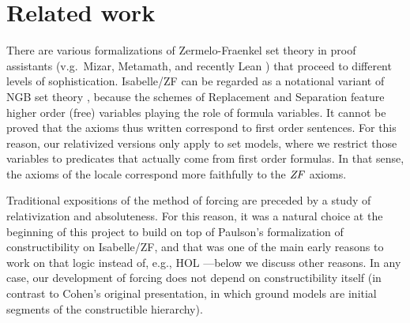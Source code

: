 \section{Related work}
\label{sec:related-work}


There are various formalizations of Zermelo-Fraenkel set theory in
proof assistants (v.g.\ Mizar, Metamath, and recently Lean
\cite{DBLP:conf/cade/MouraKADR15}) that proceed to different levels of
sophistication. Isabelle/ZF can be regarded as a notational variant of
NGB set theory \cite[Sect.~II.10]{kunen2011set}, because the schemes
of Replacement and Separation feature higher order (free) variables
playing the role of formula variables. It cannot be proved that the
axioms thus written correspond to first order sentences. For this
reason, our relativized versions only apply to set models, where
we restrict those variables to predicates that actually come
from first order formulas. In that sense, the axioms of the locale
 correspond more faithfully to the
$\mathit{ZF}$ axioms.

Traditional expositions of the method of forcing
\cite{kunen2011set,Jech_Millennium} are preceded by a study of
relativization and absoluteness. For this reason, it was a natural
choice at the beginning of this project to build on top of Paulson's
formalization of constructibility on Isabelle/ZF, and that was one
of the main early reasons to work on that logic instead of, e.g., HOL
---below we discuss other reasons. In any case, our
development of forcing does not depend on constructibility
itself (in contrast to Cohen's
original presentation, in which ground models are initial segments of the
constructible hierarchy).

